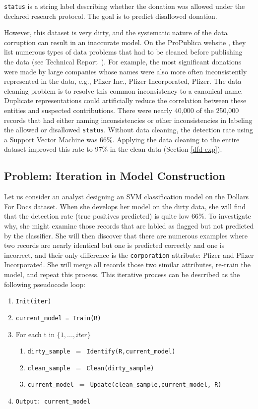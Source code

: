\noindent\texttt{status} is a string label describing whether the  donation was allowed under the declared research protocol. The goal is to predict disallowed  donation. 

\vspace{0.5em}

However, this dataset is very dirty, and the systematic nature of the data corruption can result in an inaccurate model.
On the ProPublica website \cite{dollarsfordocs}, they list numerous types of data problems that had to be cleaned before publishing the data (see Technical Report~\cite{activecleanarxiv}).
For example, the most significant donations were made by large companies whose names were also more often inconsistently represented in the data, e.g., Pfizer Inc., Pfizer Incorporated, Pfizer.
The data cleaning problem is to resolve this common inconsistency to a canonical name.
Duplicate representations could artificially reduce the correlation between these entities and suspected contributions.
There were nearly 40,000 of the 250,000 records that had either naming inconsistencies or other inconsistencies in labeling the allowed or disallowed \texttt{status}.
Without data cleaning, the detection rate using a Support Vector Machine was 66\%.
Applying the data cleaning to the entire dataset improved this rate to 97\% in the clean data (Section \ref{dfd-exp}).

\subsection{Problem: Iteration in Model Construction}
Let us consider an analyst designing an SVM classification model on the Dollars For Docs dataset.
When she develops her model on the dirty data, she will find that the detection rate (true positives predicted) is quite low 66\%.
To investigate why, she might examine those records that are labled as flagged but not predicted by the classifier.
She will then discover that there are numerous examples where two records are nearly identical but one is predicted correctly and one is incorrect, and their only difference is the \texttt{corporation} attribute: Pfizer and Pfizer Incorporated.
She will merge all records those two similar attributes, re-train the model, and repeat this process.
This iterative process can be described as the following pseudocode loop:
\begin{enumerate}[leftmargin=1em]\scriptsize\sloppy
  \item \texttt{Init(iter)}
  \item \texttt{current\_model = Train(R)}
  \item For each t in $\{1,...,iter\}$
  \begin{enumerate}
    \item \texttt{dirty\_sample $=$ Identify(R,current\_model)}
    \item \texttt{clean\_sample $=$ Clean(dirty\_sample)}
    \item \texttt{current\_model $=$ Update(clean\_sample,current\_model, R)}
  \end{enumerate}
  \item \texttt{Output: current\_model}
  \end{enumerate}

